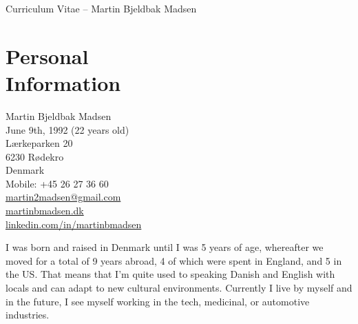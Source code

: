 \documentclass[margin,line,a4paper]{resume}
\begin{document}
\raggedright
{\sc \Large Curriculum Vitae -- Martin Bjeldbak Madsen}
\begin{resume}
    \vspace{0.5cm}
    \begin{figure}
         \vspace{-1cm}
        \begin{center}
        \end{center}
         \vspace{-2cm}
    \end{figure}

    \section{\mysidestyle Personal\\Information}%
    Martin Bjeldbak Madsen\\
    June 9th, 1992 (22 years old)\\ 
    Lærkeparken 20\\
    6230 Rødekro\\
    Denmark\\
    Mobile: +45 26 27 36 60\\
    \href{mailto:martinbmadsen@gmail.com}{martin2madsen@gmail.com}\\
    \href{http://www.martinbmadsen.dk}{martinbmadsen.dk}\\
    \href{http://dk.linkedin.com/in/martinbmadsen/}{linkedin.com/in/martinbmadsen}
    \vspace{1cm}

    I was born and raised in Denmark until I was 5 years of age,
    whereafter we moved for a total of 9 years abroad, 4 of which
    were spent in England, and 5 in the US. That means that I'm quite
    used to speaking Danish and English with locals and can adapt to
    new cultural environments. Currently I live by myself and in the
    future, I see myself working in the tech, medicinal, or automotive
    industries.


\end{resume}
\end{document}

